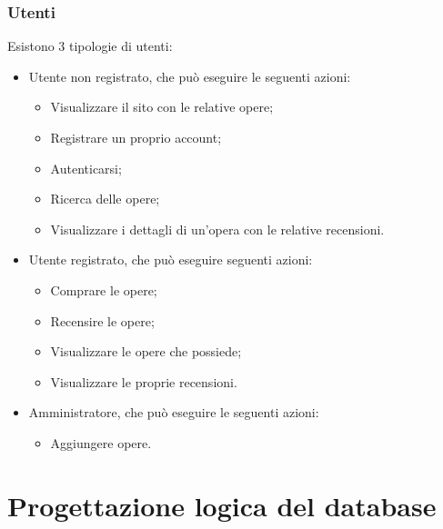 \documentclass[10pt]{article}
\begin{document}
\subsubsection{Utenti}
Esistono 3 tipologie di utenti:
\begin{itemize}
    \item Utente non registrato, che può eseguire le seguenti azioni:
    \begin{itemize}
        \item Visualizzare il sito con le relative opere;
        \item Registrare un proprio account;
        \item Autenticarsi;
        \item Ricerca delle opere;
        \item Visualizzare i dettagli di un'opera con le relative recensioni.
    \end{itemize}
    \item Utente registrato, che può eseguire seguenti azioni:
    \begin{itemize}
        \item Comprare le opere;
        \item Recensire le opere;
        \item Visualizzare le opere che possiede;
        \item Visualizzare le proprie recensioni.
    \end{itemize}
    \item Amministratore, che può eseguire le seguenti azioni:
    \begin{itemize}
        \item Aggiungere opere.
    \end{itemize}
\end{itemize}

\section{Progettazione logica del database}
\end{document}
